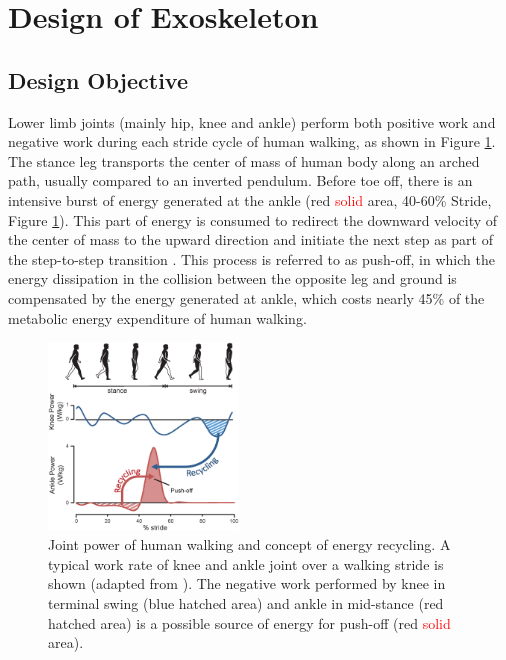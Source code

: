 \documentclass[twocolumn,cleanfoot,10pt]{asme2ej}
\begin{document}
\section{Design of Exoskeleton}
\label{sec:design}

\subsection{Design Objective}
\label{subsec:Biomechanics}

Lower limb joints (mainly hip, knee and ankle) perform both positive work and negative work during each stride cycle of human walking, as shown in Figure \ref{fig:work}.
The stance leg transports the center of mass of human body along an arched path, usually compared to an inverted pendulum\cite{RN13}.
Before toe off, there is an intensive burst of energy generated at the ankle (red \textcolor{red}{solid} area, 40-60\% Stride, Figure \ref{fig:work}).
This part of energy is consumed to redirect the downward velocity of the center of mass to the upward direction and initiate the next step as part of the step-to-step transition \cite{RN14}.
This process is referred to as push-off, in which the energy dissipation in the collision between the opposite leg and ground is compensated by the energy generated at ankle, which costs nearly 45\% of the metabolic energy expenditure of human walking\cite{RN15}.

\begin{figure}[b]
	\centering
	\includegraphics[width=0.45\textwidth]{Figure1.eps}
	\caption{Joint power of human walking and concept of energy recycling.
	A typical work rate of knee and ankle joint over a walking stride is shown (adapted from \cite{RN2}).
	The negative work performed by knee in terminal swing (blue hatched area) and ankle in mid-stance (red hatched area) is a possible source of energy for push-off (red \textcolor{red}{solid} area).}
	\label{fig:work}   
\end{figure}
\end{document}
